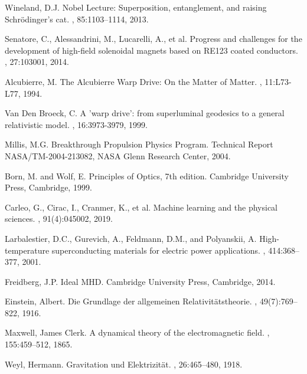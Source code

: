 \documentclass[12pt,a4paper]{article}
\begin{document}
\begin{thebibliography}{99}
Wineland, D.J.
\newblock Nobel Lecture: Superposition, entanglement, and raising Schr\"odinger's cat.
, 85:1103--1114, 2013.

Senatore, C., Alessandrini, M., Lucarelli, A., et al.
\newblock Progress and challenges for the development of high-field solenoidal magnets based on RE123 coated conductors.
, 27:103001, 2014.

Alcubierre, M.
\newblock The Alcubierre Warp Drive: On the Matter of Matter.
, 11:L73-L77, 1994.

Van Den Broeck, C.
\newblock A 'warp drive': from superluminal geodesics to a general relativistic model.
, 16:3973-3979, 1999.

Millis, M.G.
\newblock Breakthrough Propulsion Physics Program.
\newblock Technical Report NASA/TM-2004-213082, NASA Glenn Research Center, 2004.

Born, M. and Wolf, E.
\newblock Principles of Optics, 7th edition.
\newblock Cambridge University Press, Cambridge, 1999.

Carleo, G., Cirac, I., Cranmer, K., et al.
\newblock Machine learning and the physical sciences.
, 91(4):045002, 2019.

Larbalestier, D.C., Gurevich, A., Feldmann, D.M., and Polyanskii, A.
\newblock High-temperature superconducting materials for electric power applications.
, 414:368--377, 2001.

Freidberg, J.P.
\newblock Ideal MHD.
\newblock Cambridge University Press, Cambridge, 2014.

Einstein, Albert.
\newblock Die Grundlage der allgemeinen Relativitätstheorie.
, 49(7):769--822, 1916.

Maxwell, James Clerk.
\newblock A dynamical theory of the electromagnetic field.
, 155:459--512, 1865.

Weyl, Hermann.
\newblock Gravitation und Elektrizität.
, 26:465--480, 1918.


\end{thebibliography}
\end{document}
